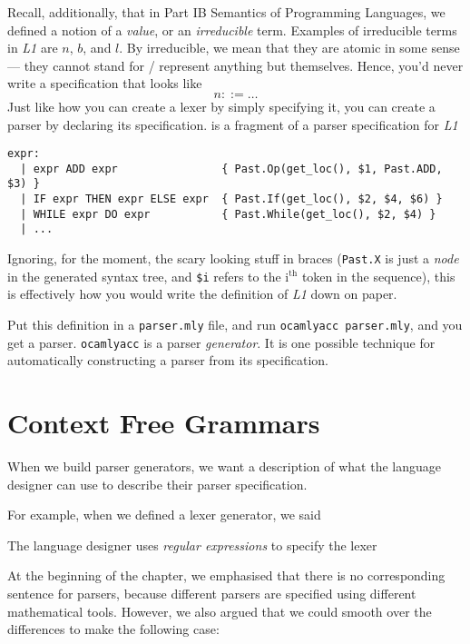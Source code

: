 Recall, additionally, that in \textsf{Part IB Semantics of Programming Languages}, we defined a notion of a \textit{value}, or an \textit{irreducible} term. Examples of irreducible terms in \textit{L1} are $n$, $b$, and $l$. By irreducible, we mean that they are atomic in some sense --- they cannot stand for / represent anything but themselves. Hence, you'd never write a specification that looks like
\[ n ::= \ldots \]
Just like how you can create a lexer by simply specifying it, you can create a parser by declaring its specification.  is a fragment of a parser specification for \textit{L1}

\begin{code}
\label{listing:parser-spec-l1}
\begin{verbatim}
expr:
  | expr ADD expr                { Past.Op(get_loc(), $1, Past.ADD, $3) }
  | IF expr THEN expr ELSE expr  { Past.If(get_loc(), $2, $4, $6) }
  | WHILE expr DO expr           { Past.While(get_loc(), $2, $4) }
  | ...
\end{verbatim}
\end{code}
Ignoring, for the moment, the scary looking stuff in braces (\texttt{Past.X} is just a \textit{node} in the generated syntax tree, and \texttt{\$i} refers to the $\text{i}^\text{th}$ token in the sequence), this is effectively how you would write the definition of \textit{L1} down on paper. 

Put this definition in a \texttt{parser.mly} file, and run \texttt{ocamlyacc parser.mly}, and you get a parser. \texttt{ocamlyacc} is a parser \textit{generator}. It is one possible technique for automatically constructing a parser from its specification.

\section{Context Free Grammars}\label{section:context-free-grammars}
When we build parser generators, we want a description of what the language designer can use to describe their parser specification. 

For example, when we defined a lexer generator, we said

\begin{center}
    The language designer uses \textit{regular expressions} to specify the lexer
\end{center}

At the beginning of the chapter, we emphasised that there is no corresponding sentence for parsers, because different parsers are specified using different mathematical tools. However, we also argued that we could smooth over the differences to make the following case:

